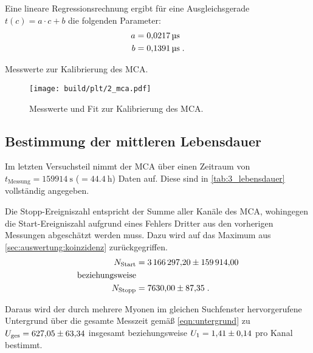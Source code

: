 Eine lineare Regressionsrechnung ergibt
für eine Ausgleichsgerade $t(c) = a \cdot c + b$
die folgenden Parameter:
\begin{align*}
    a &=\SI{0.0217 \pm 0}{\micro\second} \\
    b &=\SI{0.1391 \pm 0}{\micro\second} \; .
\end{align*}

\begin{table}
    \centering
    \caption{Messwerte zur Kalibrierung des \ac{MCA}.}
    \label{tab:2_mca}
\end{table}

\begin{figure}
    \centering
    \texttt{[image: build/plt/2\_mca.pdf]}
    \caption{Messwerte und Fit zur Kalibrierung des \ac{MCA}.}
    \label{fig:plt:2_mca}
\end{figure}


\FloatBarrier
\subsection{Bestimmung der mittleren Lebensdauer} \label{sec:auswertung:lebensdauer}
Im letzten Versuchsteil nimmt der \ac{MCA} über einen Zeitraum von $t_\text{Messung} = \SI{159914}{\second}$ ($= \SI{44.4}{\hour}$) Daten auf.
Diese sind in \autoref{tab:3_lebensdauer} vollständig angegeben.


Die Stopp-Ereigniszahl entspricht der Summe aller Kanäle des \ac{MCA}, %
wohingegen die Start-Ereigniszahl aufgrund eines Fehlers Dritter aus den vorherigen Messungen abgeschätzt werden muss.
Dazu wird auf das Maximum aus \autoref{sec:auswertung:koinzidenz} zurückgegriffen.
\begin{align*}
    N_\text{Start} &= \num{3166297.20 \pm 159914.00} \\
    \text{beziehungsweise} \\
    N_\text{Stopp} &= \num{7630.00 \pm 87.35} \; .
\end{align*}

Daraus wird der durch mehrere Myonen im gleichen Suchfenster hervorgerufene Untergrund über die gesamte Messzeit
gemäß \autoref{eqn:untergrund} zu
$U_\text{ges} = \num{627.05 \pm 63.34}$ insgesamt
beziehungsweise
$U_1 = \num{1.41 \pm 0.14}$ pro Kanal
bestimmt.

